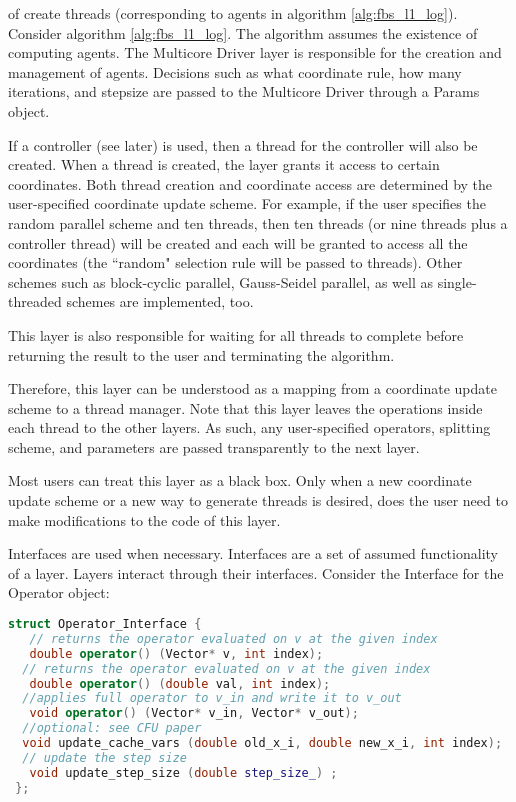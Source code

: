 of create threads (corresponding to agents in algorithm \ref{alg:fbs_l1_log}).
Consider algorithm \ref{alg:fbs_l1_log}.
The algorithm assumes the existence of computing agents.
The Multicore Driver layer is responsible for the creation and management of agents.
Decisions such as what coordinate rule, how many iterations, and stepsize are passed to the Multicore Driver through a Params object.

 If a controller (see later) is used, then a thread for the controller will also be created. When a thread is created, the layer grants it access to certain coordinates. Both thread creation and coordinate access are determined by the user-specified coordinate update scheme. For example, if the user specifies the random parallel scheme and ten threads, then ten threads (or nine threads plus a controller thread) will be created and each will  be granted to access all the coordinates (the ``random" selection rule will be passed to threads). Other schemes such as block-cyclic parallel, Gauss-Seidel parallel, as well as single-threaded schemes are implemented, too. 

This layer is also responsible for waiting for all threads to complete before returning the result to the user and terminating the algorithm.    

Therefore, this layer can be understood as a mapping from a coordinate update scheme to a thread manager. Note that this layer leaves the operations inside each thread to the other layers. As such, any user-specified operators, splitting scheme, and parameters are passed transparently to the next layer.

Most users can treat this layer as a black box. Only when a new coordinate update scheme or a new way to generate threads is desired, does the user need to make modifications to the code of this layer.



Interfaces are used when necessary. 
Interfaces are a set of assumed functionality of a layer.
Layers interact through their interfaces.
Consider the Interface for the Operator object:

\begin{lstlisting}[language=C++,label={Operator_Interface}]
struct Operator_Interface {
   // returns the operator evaluated on v at the given index
   double operator() (Vector* v, int index);
  // returns the operator evaluated on v at the given index
   double operator() (double val, int index);
  //applies full operator to v_in and write it to v_out
   void operator() (Vector* v_in, Vector* v_out);
  //optional: see CFU paper
  void update_cache_vars (double old_x_i, double new_x_i, int index);
  // update the step size
   void update_step_size (double step_size_) ;
 };
\end{lstlisting}

